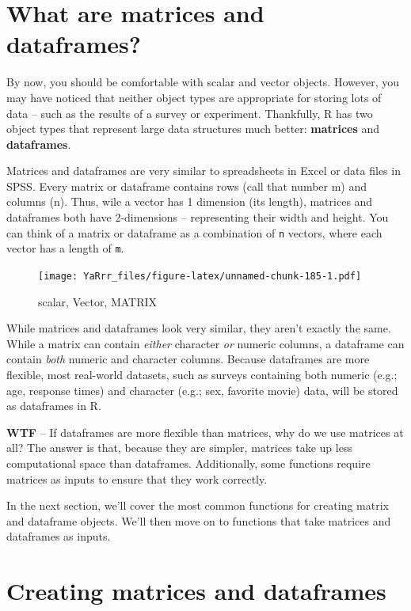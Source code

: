 \documentclass[]{book}
\theoremstyle{definition}
\theoremstyle{definition}
\theoremstyle{remark}
\begin{document}
\section{What are matrices and
dataframes?}\label{what-are-matrices-and-dataframes}

By now, you should be comfortable with scalar and vector objects.
However, you may have noticed that neither object types are appropriate
for storing lots of data -- such as the results of a survey or
experiment. Thankfully, R has two object types that represent large data
structures much better: \textbf{matrices} and \textbf{dataframes}.

Matrices and dataframes are very similar to spreadsheets in Excel or
data files in SPSS. Every matrix or dataframe contains rows (call that
number m) and columns (n). Thus, wile a vector has 1 dimension (its
length), matrices and dataframes both have 2-dimensions -- representing
their width and height. You can think of a matrix or dataframe as a
combination of \texttt{n} vectors, where each vector has a length of
\texttt{m}.

\begin{figure}
\centering
\texttt{[image: YaRrr\_files/figure-latex/unnamed-chunk-185-1.pdf]}
\caption{\label{fig:unnamed-chunk-185}scalar, Vector, MATRIX}
\end{figure}

While matrices and dataframes look very similar, they aren't exactly the
same. While a matrix can contain \emph{either} character \emph{or}
numeric columns, a dataframe can contain \emph{both} numeric and
character columns. Because dataframes are more flexible, most real-world
datasets, such as surveys containing both numeric (e.g.; age, response
times) and character (e.g.; sex, favorite movie) data, will be stored as
dataframes in R.

\textbf{WTF} -- If dataframes are more flexible than matrices, why do we
use matrices at all? The answer is that, because they are simpler,
matrices take up less computational space than dataframes. Additionally,
some functions require matrices as inputs to ensure that they work
correctly.

In the next section, we'll cover the most common functions for creating
matrix and dataframe objects. We'll then move on to functions that take
matrices and dataframes as inputs.

\section{Creating matrices and
dataframes}\label{creating-matrices-and-dataframes}
\end{document}
